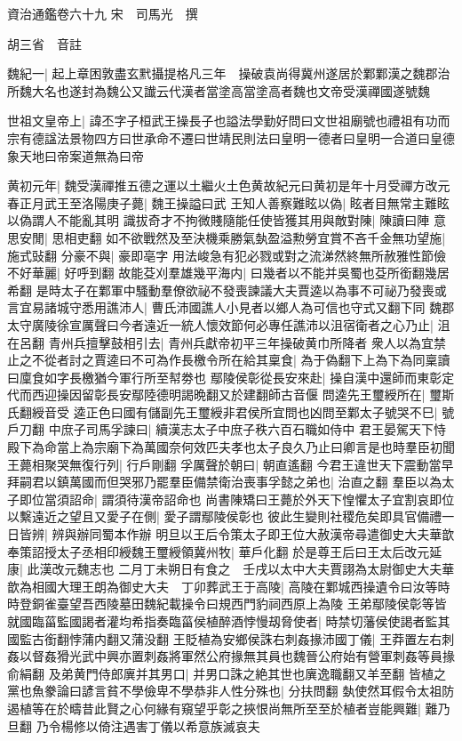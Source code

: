 資治通鑑卷六十九
宋　司馬光　撰

胡三省　音註

魏紀一|{
	起上章困敦盡玄黓攝提格凡三年　操破袁尚得冀州遂居於鄴鄴漢之魏郡治所魏大名也遂封為魏公又䜟云代漢者當塗高當塗高者魏也文帝受漢禪國遂號魏}


世祖文皇帝上|{
	諱丕字子桓武王操長子也謚法學勤好問曰文世祖廟號也禮祖有功而宗有德諡法景物四方曰世承命不遷曰世靖民則法曰皇明一德者曰皇明一合道曰皇德象天地曰帝案道無為曰帝}


黄初元年|{
	魏受漢禪推五德之運以土繼火土色黄故紀元曰黄初是年十月受禪方改元}
春正月武王至洛陽庚子薨|{
	魏王操謚曰武}
王知人善察難眩以偽|{
	眩者目無常主難眩以偽謂人不能亂其明}
識拔奇才不拘微賤隨能任使皆獲其用與敵對陳|{
	陳讀曰陣}
意思安閒|{
	思相吏翻}
如不欲戰然及至決機乘勝氣埶盈溢勲勞宜賞不吝千金無功望施|{
	施式䜴翻}
分豪不與|{
	豪即亳字}
用法峻急有犯必戮或對之流涕然終無所赦雅性節儉不好華麗|{
	好呼到翻}
故能芟刈羣雄幾平海内|{
	曰幾者以不能并吳蜀也芟所銜翻幾居希翻}
是時太子在鄴軍中騷動羣僚欲祕不發喪諫議大夫賈逵以為事不可祕乃發喪或言宜易諸城守悉用譙沛人|{
	曹氏沛國譙人小見者以鄉人為可信也守式又翻下同}
魏郡太守廣陵徐宣厲聲曰今者遠近一統人懷效節何必專任譙沛以沮宿衛者之心乃止|{
	沮在呂翻}
青州兵擅擊鼓相引去|{
	青州兵獻帝初平三年操破黄巾所降者}
衆人以為宜禁止之不從者討之賈逵曰不可為作長檄令所在給其稟食|{
	為于偽翻下上為下為同稟讀曰廩食如字長檄猶今軍行所至幇劵也}
鄢陵侯彰從長安來赴|{
	操自漢中還師而東彰定代而西迎操因留彰長安鄢陸德明謁晩翻又於建翻師古音偃}
問逵先王璽綬所在|{
	璽斯氏翻綬音受}
逵正色曰國有儲副先王璽綬非君侯所宜問也凶問至鄴太子號哭不巳|{
	號戶刀翻}
中庶子司馬孚諫曰|{
	續漢志太子中庶子秩六百石職如侍中}
君王晏駕天下恃殿下為命當上為宗廟下為萬國奈何效匹夫孝也太子良久乃止曰卿言是也時羣臣初聞王薨相聚哭無復行列|{
	行戶剛翻}
孚厲聲於朝曰|{
	朝直遙翻}
今君王違世天下震動當早拜嗣君以鎮萬國而但哭邪乃罷羣臣備禁衛治喪事孚懿之弟也|{
	治直之翻}
羣臣以為太子即位當須詔命|{
	謂須待漢帝詔命也}
尚書陳矯曰王薨於外天下惶懼太子宜割哀即位以繫遠近之望且又愛子在側|{
	愛子謂鄢陵侯彰也}
彼此生變則社稷危矣即具官備禮一日皆辨|{
	辨與辦同蜀本作辦}
明旦以王后令策太子即王位大赦漢帝尋遣御史大夫華歆奉策詔授太子丞相印綬魏王璽綬領冀州牧|{
	華戶化翻}
於是尊王后曰王太后改元延康|{
	此漢改元魏志也}
二月丁未朔日有食之　壬戌以太中大夫賈詡為太尉御史大夫華歆為相國大理王朗為御史大夫　丁卯葬武王于高陵|{
	高陵在鄴城西操遺令曰汝等時時登銅雀臺望吾西陵墓田魏紀載操令曰規西門豹祠西原上為陵}
王弟鄢陵侯彰等皆就國臨菑監國謁者灌均希指奏臨菑侯植醉酒悖慢刼脅使者|{
	時禁切藩侯使謁者監其國監古銜翻悖蒲内翻又蒲没翻}
王貶植為安鄉侯誅右刺姦掾沛國丁儀|{
	王莽置左右刺姦以督姦猾光武中興亦置刺姦將軍然公府掾無其員也魏晉公府始有營軍刺姦等員掾俞絹翻}
及弟黄門侍郎廙并其男口|{
	并男口誅之絶其世也廙逸職翻又羊至翻}
皆植之黨也魚豢論曰諺言貧不學儉卑不學恭非人性分殊也|{
	分扶問翻}
埶使然耳假令太祖防遏植等在於疇昔此賢之心何緣有窺望乎彰之挾恨尚無所至至於植者豈能興難|{
	難乃旦翻}
乃令楊修以倚注遇害丁儀以希意族滅哀夫

